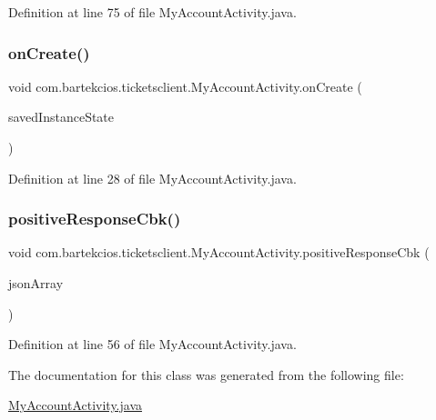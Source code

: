 Definition at line 75 of file My\+Account\+Activity.\+java.

\mbox{\label{classcom_1_1bartekcios_1_1ticketsclient_1_1_my_account_activity_abff17442ef6ee7da8d675f5c8ba0d9bc}} 
\subsubsection{\texorpdfstring{on\+Create()}{onCreate()}}
{\footnotesize\ttfamily void com.\+bartekcios.\+ticketsclient.\+My\+Account\+Activity.\+on\+Create (\begin{DoxyParamCaption}\item[{Bundle}]{saved\+Instance\+State }\end{DoxyParamCaption})\hspace{0.3cm}{\ttfamily [protected]}}



Definition at line 28 of file My\+Account\+Activity.\+java.

\mbox{\label{classcom_1_1bartekcios_1_1ticketsclient_1_1_my_account_activity_a93fbbfcbbd1ad14a90b5d4ec9c736dbf}} 
\subsubsection{\texorpdfstring{positive\+Response\+Cbk()}{positiveResponseCbk()}}
{\footnotesize\ttfamily void com.\+bartekcios.\+ticketsclient.\+My\+Account\+Activity.\+positive\+Response\+Cbk (\begin{DoxyParamCaption}\item[{J\+S\+O\+N\+Array}]{json\+Array }\end{DoxyParamCaption})}



Definition at line 56 of file My\+Account\+Activity.\+java.



The documentation for this class was generated from the following file\+:\begin{DoxyCompactItemize}
\item 
\hyperlink{_my_account_activity_8java}{My\+Account\+Activity.\+java}\end{DoxyCompactItemize}
